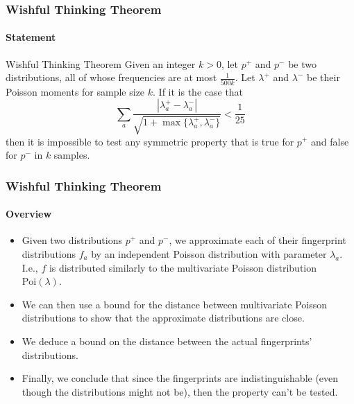 \documentclass{beamer}
\begin{document}
\begin{frame}
  \frametitle{Wishful Thinking Theorem} \framesubtitle{Statement}

  \begin{block}{Wishful Thinking Theorem}
    Given an integer $k>0$, let $p^+$ and $p^-$ be two distributions,
    all of whose frequencies are at most $\frac{1}{500k}$. Let
    $\lambda^+$ and $\lambda^-$ be their Poisson moments for sample
    size $k$. If it is the case that
    \begin{equation*}
      \sum_a\frac{|\lambda^+_a-\lambda^-_a|}{\sqrt{1+\max\{\lambda^+_a,\lambda^-_a\}}}<\frac{1}{25}
    \end{equation*}
    then it is impossible to test any symmetric property that is true
    for $p^+$ and false for $p^-$ in $k$ samples.
  \end{block}

\end{frame}

\begin{frame}
  \frametitle{Wishful Thinking Theorem} \framesubtitle{Overview}

  \begin{itemize}
  \item<1-> Given two distributions $p^+$ and $p^-$, we approximate
    each of their fingerprint distributions $f_a$ by an independent
    Poisson distribution with parameter $\lambda_a$. I.e., $f$ is
    distributed similarly to the multivariate Poisson distribution
    $\mbox{Poi}(\lambda)$.
  \item<2-> We can then use a bound for the distance between multivariate
    Poisson distributions to show that the approximate distributions
    are close.
  \item<3-> We deduce a bound on the distance between the
    actual fingerprints' distributions.
  \item<4-> Finally, we conclude that since the fingerprints are
    indistinguishable (even though the distributions might not be),
    then the property can't be tested.
  \end{itemize}

\end{frame}
\end{document}
